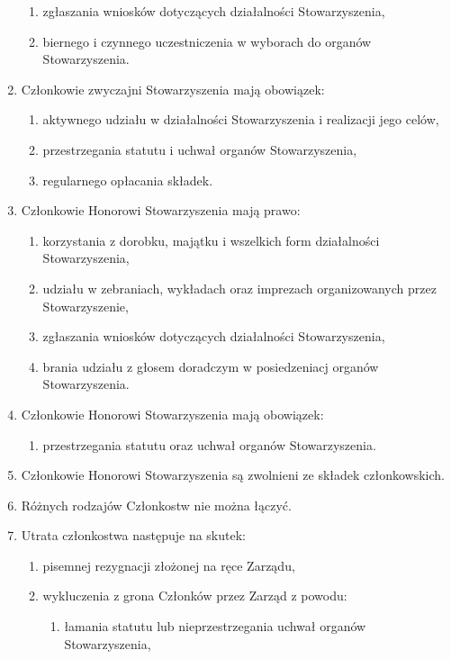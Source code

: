 \documentclass{article}
\begin{document}
\begin{enumerate}
\begin{enumerate}
        \item zgłaszania wniosków dotyczących działalności Stowarzyszenia,
        \item biernego i czynnego uczestniczenia w wyborach do organów Stowarzyszenia.
      \end{enumerate}
    \item Członkowie zwyczajni Stowarzyszenia mają obowiązek:
      \begin{enumerate}
        \item aktywnego udziału w działalności Stowarzyszenia i realizacji jego celów,
        \item przestrzegania statutu i uchwał organów Stowarzyszenia,
        \item regularnego opłacania składek.
      \end{enumerate}
    \item Członkowie Honorowi Stowarzyszenia mają prawo:
      \begin{enumerate}
        \item korzystania z dorobku, majątku i wszelkich form działalności Stowarzyszenia,
        \item udziału w zebraniach, wykładach oraz imprezach organizowanych przez Stowarzyszenie,
        \item zgłaszania wniosków dotyczących działalności Stowarzyszenia,
        \item brania udziału z głosem doradczym w posiedzeniacj organów Stowarzyszenia.
      \end{enumerate}
    \item Członkowie Honorowi Stowarzyszenia mają obowiązek:
      \begin{enumerate}
        \item przestrzegania statutu oraz uchwał organów Stowarzyszenia.
      \end{enumerate}
    \item Członkowie Honorowi Stowarzyszenia są zwolnieni ze składek członkowskich.
    \item Różnych rodzajów Członkostw nie można łączyć.
    \item Utrata członkostwa następuje na skutek:
      \begin{enumerate}
        \item pisemnej rezygnacji złożonej na ręce Zarządu,
        \item wykluczenia z grona Członków przez Zarząd z powodu:
          \begin{enumerate}
            \item łamania statutu lub nieprzestrzegania uchwał organów Stowarzyszenia,

\end{enumerate}
\end{enumerate}
\end{enumerate}
\end{document}
